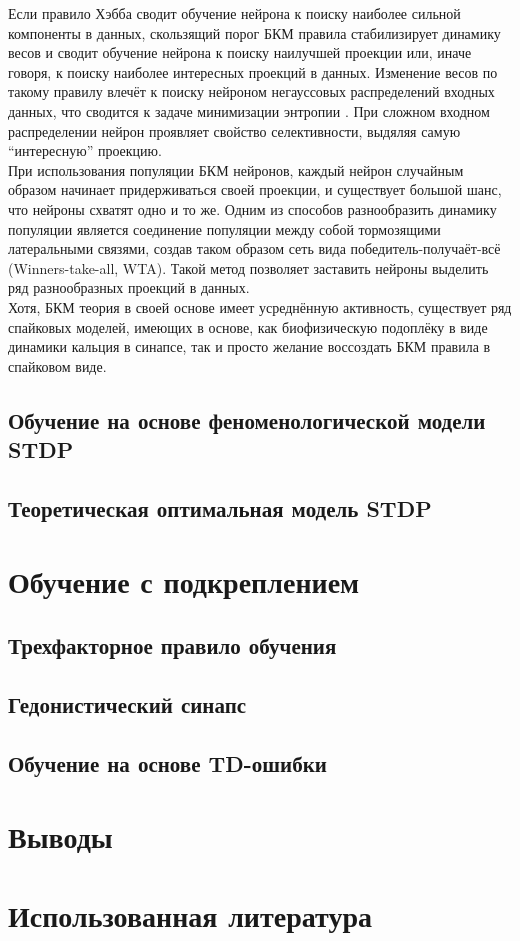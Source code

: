 \documentclass[a4paper,10pt]{article}
\begin{document}
\indent Если правило Хэбба сводит обучение нейрона к поиску наиболее сильной компоненты в данных, скользящий порог БКМ правила стабилизирует динамику весов и сводит обучение нейрона к поиску наилучшей проекции или, иначе говоря, к поиску наиболее интересных проекций в данных. Изменение весов по такому правилу влечёт к поиску нейроном негауссовых распределений входных данных, что сводится к задаче минимизации энтропии \cite{bcm_book}. При сложном входном распределении нейрон проявляет свойство селективности, выдяляя самую ``интересную'' проекцию.\\
\indent При использования популяции БКМ нейронов, каждый нейрон случайным образом начинает придерживаться своей проекции, и существует большой шанс, что нейроны схватят одно и то же. Одним из способов разнообразить динамику популяции является соединение популяции между собой тормозящими латеральными связями, создав таком образом сеть вида победитель-получаёт-всё (Winners-take-all, WTA). Такой метод позволяет заставить нейроны выделить ряд разнообразных проекций в данных.\\
\indent Хотя, БКМ теория в своей основе имеет усреднённую активность, существует ряд спайковых моделей, имеющих в основе, как биофизическую подоплёку в виде динамики кальция в синапсе\cite{ShouvalCaBCM}, так и просто желание воссоздать БКМ правила в спайковом виде\cite{PfisterTriple}.

\subsection{Обучение на основе феноменологической модели STDP}
\subsection{Теоретическая оптимальная модель STDP}
\section{Обучение с подкреплением}
\subsection{Трехфакторное правило обучения}
\subsection{Гедонистический синапс}
\subsection{Обучение на основе TD-ошибки}
\section{Выводы}
\section{Использованная литература}
{}

\end{document}
